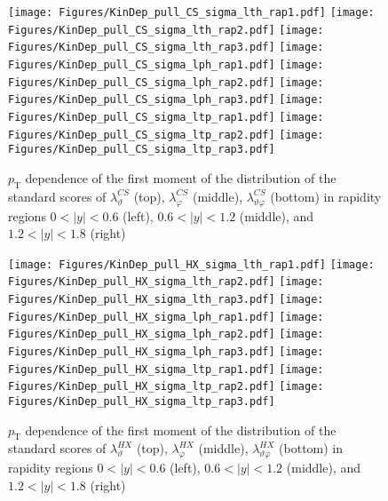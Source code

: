 \documentclass[12pt]{article}
\newcommand{\pT}{p_\mathrm{T}}
\newcommand{\absy}{\left |  y \right |}
\newcommand{\lamthCS}{\lambda^{\scriptscriptstyle CS}_\vartheta}
\newcommand{\lamphCS}{\lambda^{\scriptscriptstyle CS}_\varphi}
\newcommand{\lamthphCS}{\lambda^{\scriptscriptstyle CS}_{\vartheta \varphi}}
\newcommand{\lamthHX}{\lambda^{\scriptscriptstyle HX}_\vartheta}
\newcommand{\lamphHX}{\lambda^{\scriptscriptstyle HX}_\varphi}
\newcommand{\lamthphHX}{\lambda^{\scriptscriptstyle HX}_{\vartheta \varphi}}
\begin{document}
\begin{figure}[htbp]
\centering
\texttt{[image: Figures/KinDep\_pull\_CS\_sigma\_lth\_rap1.pdf]}
\texttt{[image: Figures/KinDep\_pull\_CS\_sigma\_lth\_rap2.pdf]}
\texttt{[image: Figures/KinDep\_pull\_CS\_sigma\_lth\_rap3.pdf]}
\texttt{[image: Figures/KinDep\_pull\_CS\_sigma\_lph\_rap1.pdf]}
\texttt{[image: Figures/KinDep\_pull\_CS\_sigma\_lph\_rap2.pdf]}
\texttt{[image: Figures/KinDep\_pull\_CS\_sigma\_lph\_rap3.pdf]}
\texttt{[image: Figures/KinDep\_pull\_CS\_sigma\_ltp\_rap1.pdf]}
\texttt{[image: Figures/KinDep\_pull\_CS\_sigma\_ltp\_rap2.pdf]}
\texttt{[image: Figures/KinDep\_pull\_CS\_sigma\_ltp\_rap3.pdf]}
\caption{$\pT$ dependence of the first moment of the distribution of the
standard scores of $\lamthCS$ (top), $\lamphCS$ (middle), $\lamthphCS$ (bottom) in rapidity
regions $0<\absy<0.6$ (left), $0.6<\absy<1.2$ (middle), and $1.2<\absy<1.8$ (right)}
\end{figure}
\clearpage

\begin{figure}[htbp]
\centering
\texttt{[image: Figures/KinDep\_pull\_HX\_sigma\_lth\_rap1.pdf]}
\texttt{[image: Figures/KinDep\_pull\_HX\_sigma\_lth\_rap2.pdf]}
\texttt{[image: Figures/KinDep\_pull\_HX\_sigma\_lth\_rap3.pdf]}
\texttt{[image: Figures/KinDep\_pull\_HX\_sigma\_lph\_rap1.pdf]}
\texttt{[image: Figures/KinDep\_pull\_HX\_sigma\_lph\_rap2.pdf]}
\texttt{[image: Figures/KinDep\_pull\_HX\_sigma\_lph\_rap3.pdf]}
\texttt{[image: Figures/KinDep\_pull\_HX\_sigma\_ltp\_rap1.pdf]}
\texttt{[image: Figures/KinDep\_pull\_HX\_sigma\_ltp\_rap2.pdf]}
\texttt{[image: Figures/KinDep\_pull\_HX\_sigma\_ltp\_rap3.pdf]}
\caption{$\pT$ dependence of the first moment of the distribution of the
standard scores of $\lamthHX$ (top), $\lamphHX$ (middle), $\lamthphHX$ (bottom) in rapidity
regions $0<\absy<0.6$ (left), $0.6<\absy<1.2$ (middle), and $1.2<\absy<1.8$ (right)}
\end{figure}
\clearpage
\end{document}
